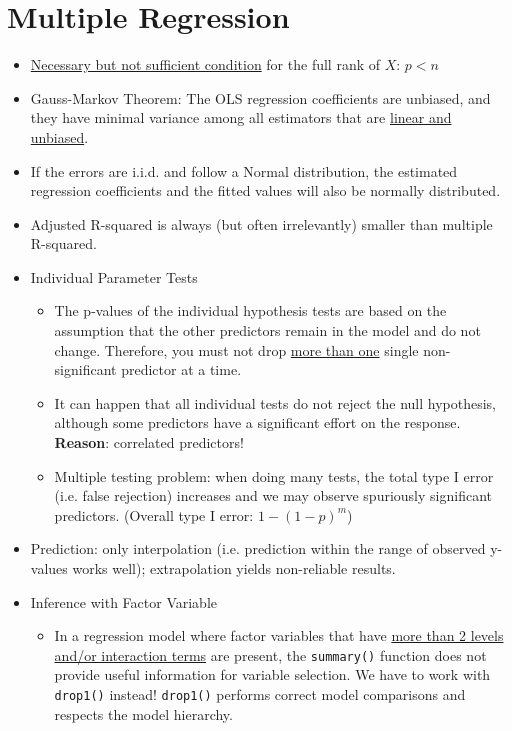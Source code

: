 \documentclass[a4paper]{article}
\begin{document}
\section{Multiple Regression}
\begin{itemize}
    \item \underline{Necessary but not sufficient condition} for the full rank of $X$: $p<n$
    \item Gauss-Markov Theorem: The OLS regression coefficients are unbiased, and they have minimal variance among all estimators that are \underline{linear and unbiased}.
    \item If the errors are i.i.d. and follow a Normal distribution, the estimated regression coefficients and the fitted values will also be normally distributed.
    \item Adjusted R-squared is always (but often irrelevantly) smaller than multiple R-squared.
    \item Individual Parameter Tests
    \begin{itemize}
        \item The p-values of the individual hypothesis tests are based on the assumption that the other predictors remain in the model and do not change. Therefore, you must not drop \underline{more than one} single non-significant predictor at a time.
        \item It can happen that all individual tests do not reject the null hypothesis, although some predictors have a significant effort on the response. \textbf{Reason}: correlated predictors!
        \item Multiple testing problem: when doing many tests, the total type I error (i.e. false rejection) increases and we may observe spuriously significant predictors. (Overall type I error: $1-(1-p)^m$)
    \end{itemize}
    \item Prediction: only interpolation (i.e. prediction within the range of observed y-values works well); extrapolation yields non-reliable results.
    \item Inference with Factor Variable
    \begin{itemize}
        \item In a regression model where factor variables that have \underline{more than 2 levels and/or interaction terms} are present, the \texttt{summary()} function does not provide useful information for variable selection. We have to work with \texttt{drop1()} instead! \texttt{drop1()} performs correct model comparisons and respects the model hierarchy.

\end{itemize}
\end{itemize}
\end{document}
